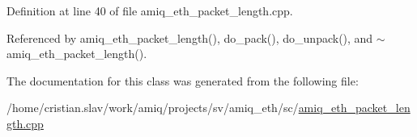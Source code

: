 Definition at line 40 of file amiq\_\-eth\_\-packet\_\-length.cpp.

Referenced by amiq\_\-eth\_\-packet\_\-length(), do\_\-pack(), do\_\-unpack(), and $\sim$amiq\_\-eth\_\-packet\_\-length().

The documentation for this class was generated from the following file:\begin{DoxyCompactItemize}
\item 
/home/cristian.slav/work/amiq/projects/sv/amiq\_\-eth/sc/\hyperlink{amiq__eth__packet__length_8cpp}{amiq\_\-eth\_\-packet\_\-length.cpp}\end{DoxyCompactItemize}
